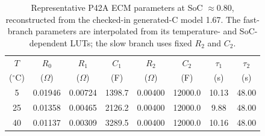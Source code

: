 \begin{table}[t]
\caption{Representative P42A ECM parameters at SoC $\approx 0.80$, reconstructed from the checked-in generated-C model 1.67. The fast-branch parameters are interpolated from its temperature- and SoC-dependent LUTs; the slow branch uses fixed $R_2$ and $C_2$.}
\label{tab:ecm_parameters}
\centering
\begin{tabular}{c c c c c c c c}
\hline
$T$ & $R_0$ & $R_1$ & $C_1$ & $R_2$ & $C_2$ & $\tau_1$ & $\tau_2$ \\
($^\circ$C) & ($\Omega$) & ($\Omega$) & (F) & ($\Omega$) & (F) & (s) & (s) \\
\hline
5 & 0.01946 & 0.00724 & 1398.7 & 0.00400 & 12000.0 & 10.13 & 48.00 \\
25 & 0.01358 & 0.00465 & 2126.2 & 0.00400 & 12000.0 & 9.88 & 48.00 \\
40 & 0.01137 & 0.00309 & 3289.5 & 0.00400 & 12000.0 & 10.16 & 48.00 \\
\hline
\end{tabular}
\end{table}
